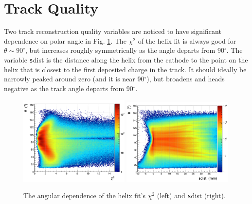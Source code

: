 \documentclass[amsmath,amssymb,notitlepage,11pt]{revtex4-1}
\begin{document}
\section{Track Quality}
Two track reconstruction quality variables are noticed to have significant dependence on polar angle in Fig. \ref{fig:sdist}.  The $\chi^2$ of the helix fit is always good for $\theta\sim90^\circ$, but increases roughly symmetrically as the angle departs from 90$^\circ$.  The variable {\texttt sdist} is the distance along the helix from the cathode to the point on the helix that is closest to the first deposited charge in the track.  It should ideally be narrowly peaked around zero (and it is near 90$^
\circ$), but broadens and heads negative as the track angle departs from 90$^\circ$.
\begin{figure}[htbp]\centering
    \includegraphics[width=0.49\textwidth]{pics/chi2_vs_theta_small.png}
    \includegraphics[width=0.49\textwidth]{pics/sdist_vs_theta_small.png}
    \caption{The angular dependence of the helix fit's $\chi^2$ (left) and {\texttt sdist} (right). 
    \label{fig:sdist}}
\end{figure}


%
\end{document}
